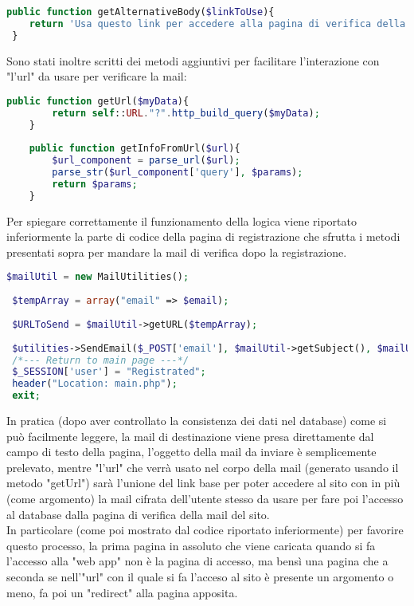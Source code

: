   \begin{lstlisting}[language=php]
 public function getAlternativeBody($linkToUse){
 	return 'Usa questo link per accedere alla pagina di verifica della mail: '.$linkToUse;
 }
  \end{lstlisting}
  
  Sono stati inoltre scritti dei metodi aggiuntivi per facilitare l'interazione con "l'url" da usare per verificare la mail:\\
  
 \begin{lstlisting}[language=php]
   	public function getUrl($myData){
   		return self::URL."?".http_build_query($myData);
   	}
   	
   	public function getInfoFromUrl($url){
   		$url_component = parse_url($url);
   		parse_str($url_component['query'], $params);
   		return $params;
   	}
 \end{lstlisting}
 
 Per spiegare correttamente il funzionamento della logica viene riportato inferiormente la parte di codice della pagina di registrazione che sfrutta i metodi presentati sopra per mandare la mail di verifica dopo la registrazione. 
 
 \begin{lstlisting}[language=php]
 $mailUtil = new MailUtilities();
 
 $tempArray = array("email" => $email);
 
 $URLToSend = $mailUtil->getURL($tempArray);
 
 $utilities->SendEmail($_POST['email'], $mailUtil->getSubject(), $mailUtil->getBody($URLToSend), $mailUtil->getAlternativeBody($URLToSend));
 /*--- Return to main page ---*/
 $_SESSION['user'] = "Registrated";
 header("Location: main.php");
 exit;
  \end{lstlisting}
  
  In pratica (dopo aver controllato la consistenza dei dati nel database) come si può facilmente leggere, la mail di destinazione viene presa direttamente dal campo di testo della pagina, l'oggetto della mail da inviare è semplicemente prelevato, mentre "l'url" che verrà usato nel corpo della mail (generato usando il metodo "getUrl") sarà l'unione del link base per poter accedere al sito con in più (come argomento) la mail cifrata dell'utente stesso da usare per fare poi l'accesso al database dalla pagina di verifica della mail del sito.\\
  In particolare (come poi mostrato dal codice riportato inferiormente) per favorire questo processo, la prima pagina in assoluto che viene caricata quando si fa l'accesso alla "web app" non è la pagina di accesso, ma bensì una pagina che a seconda se nell'"url" con il quale si fa l'acceso al sito è presente un argomento o meno, fa poi un "redirect" alla pagina apposita.\\
  

